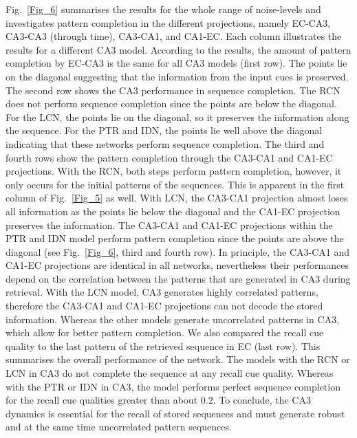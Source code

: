 \documentclass[utf8]{frontiersSCNS} %
\begin{document}
Fig.~\ref{Fig_6} summarises the results for the whole range of noise-levels and investigates pattern completion in the different projections, namely EC-CA3, CA3-CA3 (through time), CA3-CA1, and CA1-EC. Each column illustrates the results for a different CA3 model. According to the results, the amount of pattern completion by EC-CA3 is the same for all CA3 models (first row). The points lie on the diagonal suggesting that the information from the input cues is preserved. The second row shows the CA3 performance in sequence completion. The RCN does not perform sequence completion since the points are below the diagonal. For the LCN, the points lie on the diagonal, so it preserves the information along the sequence. For the PTR and IDN, the points lie well above the diagonal indicating that these networks perform sequence completion.      
%
The third and fourth rows show the pattern completion through the CA3-CA1 and CA1-EC projections. With the RCN, both steps perform pattern completion, however, it only occurs for the initial patterns of the sequences. This is apparent in the first column of Fig.~\ref{Fig_5} as well. With LCN, the CA3-CA1 projection almost loses all information as the points lie below the diagonal and the CA1-EC projection preserves the information.
%
The CA3-CA1 and CA1-EC projections within the PTR and IDN model perform pattern completion since the points are above the diagonal (see Fig.~\ref{Fig_6}, third and fourth row).  
%
In principle, the CA3-CA1 and CA1-EC projections are identical in all networks, nevertheless their performances depend on the correlation between the patterns that are generated in CA3 during retrieval. With the LCN model, CA3 generates highly correlated patterns, therefore the CA3-CA1 and CA1-EC projections can not decode the stored information. Whereas the other models generate uncorrelated patterns in CA3, which allow for better pattern completion.  
%
We also compared the recall cue quality to the last pattern of the retrieved sequence in EC (last row). This summarises the overall performance of the network. The models with the RCN or LCN in CA3 do not complete the sequence at any recall cue quality. Whereas with the PTR or IDN in CA3, the model performs perfect sequence completion for the recall cue qualities greater than about $0.2$.
%
To conclude, the CA3 dynamics is essential for the recall of stored sequences and must generate robust and at the same time uncorrelated pattern sequences.          
\end{document}
